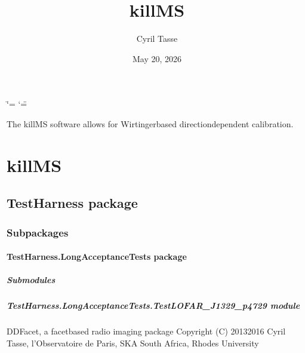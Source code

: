 \documentclass[letterpaper,10pt,english]{sphinxmanual}
\title{killMS}
\date{May 20, 2026}
\author{Cyril Tasse}
\begin{document}
\ifdefined\shorthandoff
  \ifnum\catcode`\=\string=\active\shorthandoff{=}\fi
  \ifnum\catcode`\"=\active{}\fi
\fi

\pagestyle{empty}
\sphinxmaketitle
\pagestyle{plain}
\sphinxtableofcontents
\pagestyle{normal}
\label{\detokenize{index::doc}}


\sphinxAtStartPar
The killMS software allows for Wirtinger\sphinxhyphen{}based direction\sphinxhyphen{}dependent calibration.

\sphinxstepscope


\chapter{killMS}
\label{\detokenize{api/modules:killms}}\label{\detokenize{api/modules::doc}}
\sphinxstepscope


\section{TestHarness package}
\label{\detokenize{api/TestHarness:testharness-package}}\label{\detokenize{api/TestHarness::doc}}

\subsection{Subpackages}
\label{\detokenize{api/TestHarness:subpackages}}
\sphinxstepscope


\subsubsection{TestHarness.LongAcceptanceTests package}
\label{\detokenize{api/TestHarness.LongAcceptanceTests:testharness-longacceptancetests-package}}\label{\detokenize{api/TestHarness.LongAcceptanceTests::doc}}

\paragraph{Submodules}
\label{\detokenize{api/TestHarness.LongAcceptanceTests:submodules}}

\paragraph{TestHarness.LongAcceptanceTests.TestLOFAR\_J1329\_p4729 module}
\label{\detokenize{api/TestHarness.LongAcceptanceTests:module-TestHarness.LongAcceptanceTests.TestLOFAR_J1329_p4729}}\label{\detokenize{api/TestHarness.LongAcceptanceTests:testharness-longacceptancetests-testlofar-j1329-p4729-module}}
\sphinxAtStartPar
DDFacet, a facet\sphinxhyphen{}based radio imaging package
Copyright (C) 2013\sphinxhyphen{}2016  Cyril Tasse, l’Observatoire de Paris,
SKA South Africa, Rhodes University
\end{document}
